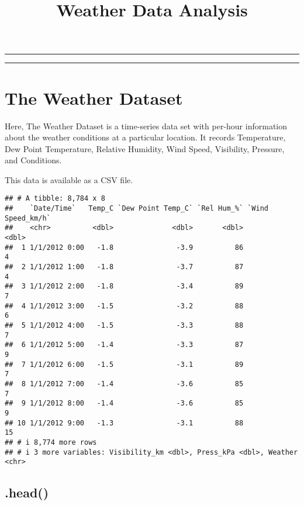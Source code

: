 \documentclass[
]{article}
\title{Weather Data Analysis}
\author{}
\date{\vspace{-2.5em}}
\begin{document}
\maketitle

\begin{center}\rule{0.5\linewidth}{0.5pt}\end{center}

\begin{center}\rule{0.5\linewidth}{0.5pt}\end{center}

\hypertarget{the-weather-dataset}{%
\section{The Weather Dataset}\label{the-weather-dataset}}

Here, The Weather Dataset is a time-series data set with per-hour
information about the weather conditions at a particular location. It
records Temperature, Dew Point Temperature, Relative Humidity, Wind
Speed, Visibility, Pressure, and Conditions.

This data is available as a CSV file.

\begin{verbatim}
## # A tibble: 8,784 x 8
##    `Date/Time`   Temp_C `Dew Point Temp_C` `Rel Hum_%` `Wind Speed_km/h`
##    <chr>          <dbl>              <dbl>       <dbl>             <dbl>
##  1 1/1/2012 0:00   -1.8               -3.9          86                 4
##  2 1/1/2012 1:00   -1.8               -3.7          87                 4
##  3 1/1/2012 2:00   -1.8               -3.4          89                 7
##  4 1/1/2012 3:00   -1.5               -3.2          88                 6
##  5 1/1/2012 4:00   -1.5               -3.3          88                 7
##  6 1/1/2012 5:00   -1.4               -3.3          87                 9
##  7 1/1/2012 6:00   -1.5               -3.1          89                 7
##  8 1/1/2012 7:00   -1.4               -3.6          85                 7
##  9 1/1/2012 8:00   -1.4               -3.6          85                 9
## 10 1/1/2012 9:00   -1.3               -3.1          88                15
## # i 8,774 more rows
## # i 3 more variables: Visibility_km <dbl>, Press_kPa <dbl>, Weather <chr>
\end{verbatim}

\hypertarget{head}{%
\subsection{.head()}\label{head}}
\end{document}
